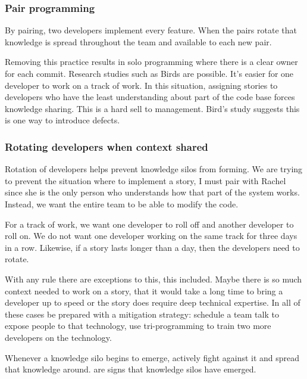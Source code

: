 \subsubsection{Pair programming}
By pairing, two developers implement every feature. When the pairs rotate that knowledge is spread throughout the team and available to each new pair. 

Removing this practice results in solo programming where there is a clear owner for each commit. Research studies such as Birds are possible. It's easier for one developer to work on a track of work. In this situation, assigning stories to developers who have the least understanding about part of the code base forces knowledge sharing. This is a hard sell to management. Bird's study suggests this is one way to introduce defects. 

\subsubsection{Rotating developers when context shared}
Rotation of developers helps prevent knowledge silos from forming. We are trying to prevent the situation where to implement a story, I must pair with Rachel since she is the only person who understands how that part of the system works. Instead, we want the entire team to be able to modify the code. 

For a track of work, we want one developer to roll off and another developer to roll on.  We do not want one developer working on the same track for three days in a row. Likewise, if a story lasts longer than a day, then the developers need to rotate.

With any rule there are exceptions to this, this included. Maybe there is so much context needed to work on a story, that it would take a long time to bring a developer up to speed or the story does require deep technical expertise. In all of these cases be prepared with a mitigation strategy: schedule a team talk to expose people to that technology, use tri-programming to train two more developers on the technology. 

Whenever a knowledge silo begins to emerge, actively fight against it and spread that knowledge around.  are signs that knowledge silos have emerged. 

